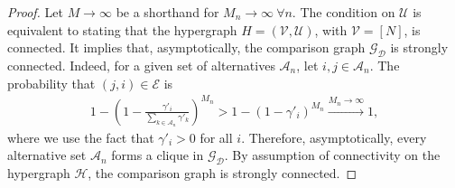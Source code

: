 \begin{proof}
Let $M \to \infty$ be a shorthand for $M_n \to \infty \ \forall n$.
The condition on $\mathcal{U}$ is equivalent to stating that the hypergraph $H = (\mathcal{V}, \mathcal{U})$, with $\mathcal{V} = [N]$, is connected.
It implies that, asymptotically, the comparison graph $\mathcal{G}_{\mathcal{D}}$ is strongly connected.
Indeed, for a given set of alternatives $\mathcal{A}_n$, let $i, j \in \mathcal{A}_n$.
The probability that $(j, i) \in \mathcal{E}$ is
\begin{align*}
1 - \left(1 - \frac{\gamma'_i}{\sum_{k \in \mathcal{A}_n} \gamma'_k} \right)^{M_n}
> 1 - (1 - \gamma'_i)^{M_n}
\xrightarrow{M_n \to \infty} 1,
\end{align*}
where we use the fact that $\gamma'_i > 0$ for all $i$.
Therefore, asymptotically, every alternative set $\mathcal{A}_n$ forms a clique in $\mathcal{G}_{\mathcal{D}}$.
By assumption of connectivity on the hypergraph $\mathcal{H}$, the comparison graph is strongly connected.


\end{proof}
